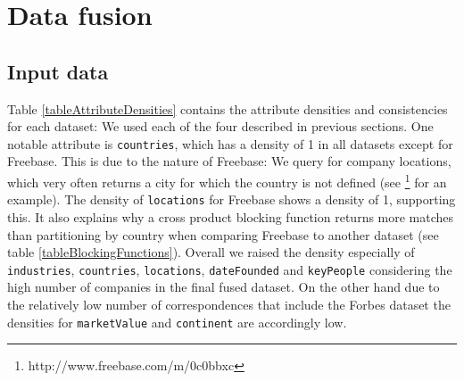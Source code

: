 \section{Data fusion}
\subsection{Input data}
Table \ref{tableAttributeDensities} contains the attribute densities and consistencies for each dataset: We used each of the four described in previous sections. One notable attribute is \texttt{countries}, which has a density of 1 in all datasets except for Freebase. This is due to the nature of Freebase: We query for company locations, which very often returns a city for which the country is not defined (see \footnote{http://www.freebase.com/m/0c0bbxc} for an example). The density of \texttt{locations} for Freebase shows a density of 1, supporting this. It also explains why a cross product blocking function returns more matches than partitioning by country when comparing Freebase to another dataset (see table \ref{tableBlockingFunctions}). Overall we raised the density especially of \texttt{industries}, \texttt{countries}, \texttt{locations}, \texttt{dateFounded} and \texttt{keyPeople} considering the high number of companies in the final fused dataset. On the other hand due to the relatively low number of correspondences that include the Forbes dataset the densities for \texttt{marketValue} and \texttt{continent} are accordingly low. 



